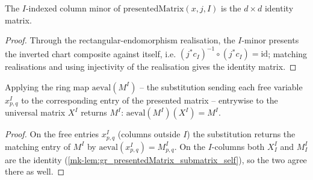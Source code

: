 \begin{lemma}\label{mk-lem:gr_presentedMatrix_submatrix_self}
  \leanok

  The \(I\)-indexed column minor of \(\mathrm{presentedMatrix}(x, j, I)\) is the \(d\times d\)
  identity matrix.
\end{lemma}
\begin{proof}
  Through the rectangular-endomorphism realisation, the \(I\)-minor presents the inverted
  chart composite against itself, i.e. \((j^{*}c_I)^{-1}\circ (j^{*}c_I) = \mathrm{id}\);
  matching realisations and using injectivity of the realisation gives the identity matrix.
\end{proof}

\begin{lemma}\label{mk-lem:gr_universalMatrix_map_presentedMatrix}
  \leanok

  Applying the ring map \(\mathrm{aeval}(M^I)\) -- the substitution sending each free variable
  \(x^I_{p,q}\) to the corresponding entry of the presented matrix -- entrywise to the
  universal matrix \(X^I\) returns \(M^I\): \(\mathrm{aeval}(M^I)(X^I) = M^I\).
\end{lemma}
\begin{proof}
  On the free entries \(x^I_{p,q}\) (columns outside \(I\)) the substitution returns the
  matching entry of \(M^I\) by \(\mathrm{aeval}(x^I_{p,q}) = M^I_{p,q}\). On the \(I\)-columns
  both \(X^I_I\) and \(M^I_I\) are the identity (\ref{mk-lem:gr_presentedMatrix_submatrix_self}),
  so the two agree there as well.
\end{proof}

